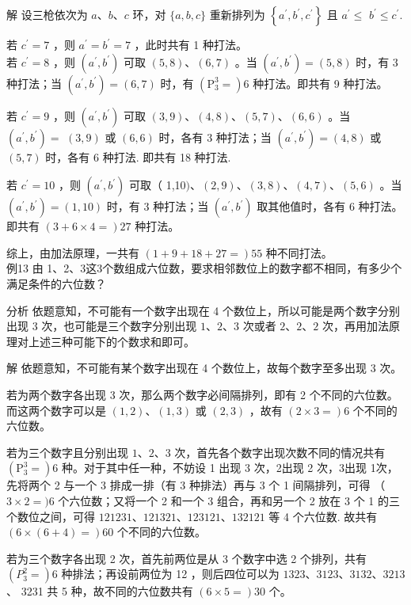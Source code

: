 \documentclass[10pt]{article}
\begin{document}
解 设三枪依次为 $a 、 b 、 c$ 环，对 $\{a, b, c\}$ 重新排列为 $\left\{a^{\prime}, b^{\prime}, c^{\prime}\right\}$ 且 $a^{\prime} \leqslant$ $b^{\prime} \leqslant c^{\prime}$.

若 $c^{\prime}=7$ ，则 $a^{\prime}=b^{\prime}=7$ ，此时共有 1 种打法。\\
若 $c^{\prime}=8$ ，则 $\left(a^{\prime}, b^{\prime}\right)$ 可取 $(5,8) 、(6,7)$ 。当 $\left(a^{\prime}, b^{\prime}\right)=(5,8)$ 时，有 3 种打法；当 $\left(a^{\prime}, b^{\prime}\right)=(6,7)$ 时，有 $\left(\mathrm{P}_{3}^{3}=\right) 6$ 种打法。即共有 9 种打法。

若 $c^{\prime}=9$ ，则 $\left(a^{\prime}, b^{\prime}\right)$ 可取 $(3,9) 、(4,8) 、(5,7) 、(6,6)$ 。当 $\left(a^{\prime}, b^{\prime}\right)=$ $(3,9)$ 或 $(6,6)$ 时，各有 3 种打法；当 $\left(a^{\prime}, b^{\prime}\right)=(4,8)$ 或 $(5,7)$ 时，各有 6 种打法. 即共有 18 种打法.

若 $c^{\prime}=10$ ，则 $\left(a^{\prime}, b^{\prime}\right)$ 可取（ 1,10$) 、(2,9) 、(3,8) 、(4,7) 、(5,6)$ 。当 $\left(a^{\prime}, b^{\prime}\right)=(1,10)$ 时，有 3 种打法；当 $\left(a^{\prime}, b^{\prime}\right)$ 取其他值时，各有 6 种打法。即共有 $(3+6 \times 4=) 27$ 种打法。

综上，由加法原理，一共有 $(1+9+18+27=) 55$ 种不同打法。\\
例13 由 1、2、3这3个数组成六位数，要求相邻数位上的数字都不相同，有多少个满足条件的六位数？

分析 依题意知，不可能有一个数字出现在 4 个数位上，所以可能是两个数字分别出现 3 次，也可能是三个数字分别出现 $1 、 2 、 3$ 次或者 $2 、 2 、 2$ 次，再用加法原理对上述三种可能下的个数求和即可。

解 依题意知，不可能有某个数字出现在 4 个数位上，故每个数字至多出现 3 次。

若为两个数字各出现 3 次，那么两个数字必间隔排列，即有 2 个不同的六位数。而这两个数字可以是 $(1,2) 、(1,3)$ 或 $(2,3)$ ，故有 $(2 \times 3=) 6$ 个不同的六位数。

若为三个数字且分别出现 $1 、 2 、 3$ 次，首先各个数字出现次数不同的情况共有 $\left(\mathrm{P}_{3}^{3}=\right) 6$ 种。对于其中任一种，不妨设 1 出现 3 次，2出现 2 次，3出现 1次，先将两个 2 与一个 3 排成一排（有 3 种排法）再与 3 个 1 间隔排列，可得 （ $3 \times 2=) 6$ 个六位数；又将一个 2 和一个 3 组合，再和另一个 2 放在 3 个 1 的三个数位之间，可得 $121231 、 121321 、 123121 、 132121$ 等 4 个六位数. 故共有 $(6 \times(6+4)=) 60$ 个不同的六位数。

若为三个数字各出现 2 次，首先前两位是从 3 个数字中选 2 个排列，共有 $\left(P_{3}^{2}=\right) 6$ 种排法；再设前两位为 12 ，则后四位可以为 $1323 、 3123 、 3132 、 3213$ 、 3231 共 5 种，故不同的六位数共有 $(6 \times 5=) 30$ 个。
\end{document}

